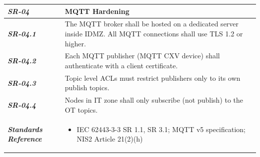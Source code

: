 \documentclass[11pt,a4paper]{article}
\begin{document}
\begin{tabularx}{\textwidth}{>{\bfseries}p{2.5cm} X}
    \textit{SR-04} & \textbf{MQTT Hardening} \vspace{0.5em}\\
\toprule
\textit{SR-04.1} &
    The MQTT broker shall be hosted on a dedicated server inside IDMZ. All MQTT connections shall use TLS 1.2 or higher.
    \vspace{0.5em}
\\
\textit{SR-04.2} &
    Each MQTT publisher (MQTT CXV device) shall authenticate with a client certificate.
    \vspace{0.5em}
    \\
\textit{SR-04.3} &
    Topic level ACLs must restrict publishers only to its own publish topics.
    \vspace{0.5em}
    \\
\textit{SR-04.4} &
    Nodes in IT zone shall only subscribe (not publish) to the OT topics.
    \vspace{0.5em}
    \\
\midrule
    \textit{Standards Reference} &
\begin{itemize}[label=-, noitemsep, topsep=0pt, leftmargin=*]
    \item IEC 62443-3-3 SR 1.1, SR 3.1; MQTT v5 specification; NIS2 Article 21(2)(h)
\end{itemize} \vspace{1em} \\ 
\end{tabularx}
\vspace{2em}
\end{document}
